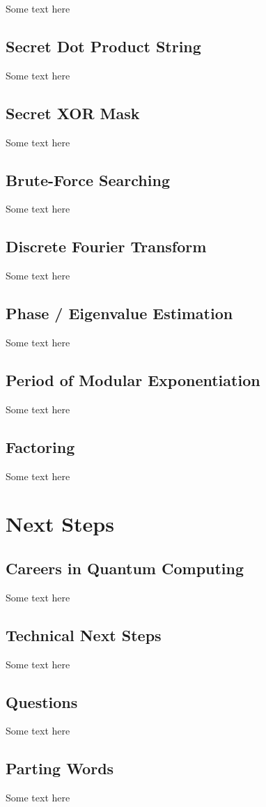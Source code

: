\documentclass{article}
\begin{document}
Some text here

\subsection{Secret Dot Product String}

Some text here

\subsection{Secret XOR Mask}

Some text here

\subsection{Brute-Force Searching}

Some text here

\subsection{Discrete Fourier Transform}

Some text here

\subsection{Phase / Eigenvalue Estimation}

Some text here

\subsection{Period of Modular Exponentiation}

Some text here

\subsection{Factoring}

Some text here

\section{Next Steps} %

\subsection{Careers in Quantum Computing}

Some text here

\subsection{Technical Next Steps}

Some text here

\subsection{Questions}

Some text here

\subsection{Parting Words}

Some text here
\end{document}
